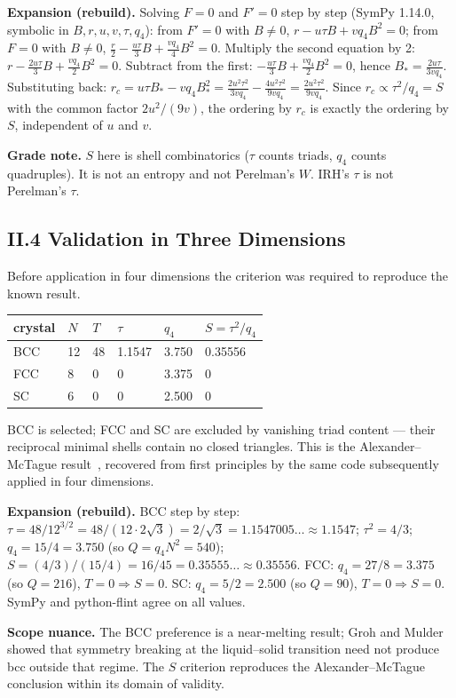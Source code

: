 \documentclass[11pt,a4paper]{article}
\newcommand{\expansion}[1]{\par\smallskip\noindent\textbf{Expansion (rebuild).} #1\par\smallskip}
\newcommand{\gradebox}[1]{\par\smallskip\noindent\textbf{Grade note.} #1\par\smallskip}
\begin{document}
\expansion{Solving $F = 0$ and $F' = 0$ step by step (SymPy 1.14.0, symbolic in $B, r, u, v, \tau, q_4$): from $F' = 0$ with $B \neq 0$, $r - u\tau B + vq_4 B^2 = 0$; from $F = 0$ with $B \neq 0$, $\tfrac{r}{2} - \tfrac{u\tau}{3}B + \tfrac{vq_4}{4}B^2 = 0$. Multiply the second equation by 2: $r - \tfrac{2u\tau}{3}B + \tfrac{vq_4}{2}B^2 = 0$. Subtract from the first: $-\tfrac{u\tau}{3}B + \tfrac{vq_4}{2}B^2 = 0$, hence $B_* = \tfrac{2u\tau}{3vq_4}$. Substituting back: $r_c = u\tau B_* - vq_4 B_*^2 = \tfrac{2u^2\tau^2}{3vq_4} - \tfrac{4u^2\tau^2}{9vq_4} = \tfrac{2u^2\tau^2}{9vq_4}$. Since $r_c \propto \tau^2/q_4 = S$ with the common factor $2u^2/(9v)$, the ordering by $r_c$ is exactly the ordering by $S$, independent of $u$ and $v$.}
\gradebox{$S$ here is shell combinatorics ($\tau$ counts triads, $q_4$ counts quadruples). It is not an entropy and not Perelman's $W$. IRH's $\tau$ is not Perelman's $\tau$.}

\subsection{II.4 Validation in Three Dimensions}
Before application in four dimensions the criterion was required to reproduce the known result.
\begin{center}
\begin{tabular}{llllll}
\toprule
crystal & $N$ & $T$ & $\tau$ & $q_4$ & $S = \tau^2/q_4$ \\
\midrule
BCC & 12 & 48 & 1.1547 & 3.750 & 0.35556 \\
FCC & 8 & 0 & 0 & 3.375 & 0 \\
SC & 6 & 0 & 0 & 2.500 & 0 \\
\bottomrule
\end{tabular}
\end{center}
BCC is selected; FCC and SC are excluded by vanishing triad content --- their reciprocal minimal shells contain no closed triangles. This is the Alexander--McTague result~\cite{alexander1978}, recovered from first principles by the same code subsequently applied in four dimensions.

\expansion{BCC step by step: $\tau = 48/12^{3/2} = 48/(12 \cdot 2\sqrt{3}) = 2/\sqrt{3} = 1.1547005\ldots \approx 1.1547$; $\tau^2 = 4/3$; $q_4 = 15/4 = 3.750$ (so $Q = q_4N^2 = 540$); $S = (4/3)/(15/4) = 16/45 = 0.35555\ldots \approx 0.35556$. FCC: $q_4 = 27/8 = 3.375$ (so $Q = 216$), $T = 0 \Rightarrow S = 0$. SC: $q_4 = 5/2 = 2.500$ (so $Q = 90$), $T = 0 \Rightarrow S = 0$. SymPy and python-flint agree on all values.}
\textbf{Scope nuance.} The BCC preference is a near-melting result; Groh and Mulder~\cite{groh1999} showed that symmetry breaking at the liquid--solid transition need not produce bcc outside that regime. The $S$ criterion reproduces the Alexander--McTague conclusion within its domain of validity.
\end{document}
